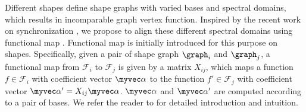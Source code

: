 Different shapes define shape graphs with varied bases and spectral domains, which results in incomparable graph vertex function. Inspired by the recent work on synchronization \cite{singer2011angular,wang2013image,wang2014unsupervised}, we propose to align these different spectral domains using functional map \cite{ovsjanikov2012functional}. Functional map is initially introduced for this purpose on shapes. Specifically, given a pair of shape graph $\graph_i$ and $\graph_j$, a functional map from $\mathcal{F}_i$ to $\mathcal{F}_j$ is given by a matrix $X_{ij}$, which maps a function $f\in \mathcal{F}_i$ with coefficient vector $\myvec \alpha$ to the function $f'\in \mathcal{F}_j$  with coefficient vector $\myvec \alpha' = X_{ij} \myvec \alpha$. $\myvec \alpha$ and $\myvec \alpha'$ are computed according to a pair of bases. We refer the reader to \cite{ovsjanikov2012functional} for detailed introduction and intuition.  
\iffalse
\todo{
  \begin{itemize}
    \item each shape defines a different shape graph, thus different graph laplacian. 
    \item consequently, they generate individual bases, thus independent spectral domain.
    \item Therefore, functions defined on different shapes are not directly comparable, because the spectral domain they live in are not aligned.
    \item functional map is introduced to align the spectral domain of different shapes. specifically, given a pair of shape graph $\graph_i$ and $\graph_j$, a functional map from $\mathcal{F}_i$ to $\mathcal{F}_j$ is given by a matrix $X_{ij}$, which maps a function $f\in \mathcal{F}_i$ with coefficient vector $\myvec \alpha$ to the function $f'\in \mathcal{F}_j$  with coefficient vector $\myvec \alpha' = X_{ij} \myvec \alpha$. $\myvec \alpha$ and $\myvec \alpha'$ are computed according to a pair of bases. We refer the reader to CITATION for a more detailed introduction and intuition. 
\end{itemize} 
}
\fi

